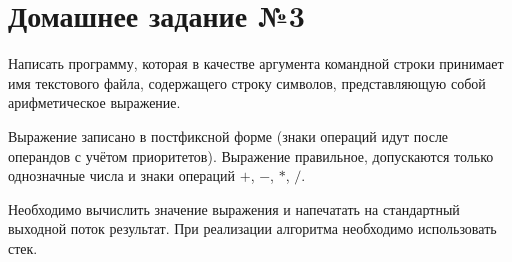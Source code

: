 \section*{Домашнее задание №3}


Написать программу, которая в качестве аргумента командной строки
принимает имя текстового файла, содержащего строку символов,
представляющую собой арифметическое выражение.

Выражение записано
в постфиксной форме (знаки операций идут после операндов с учётом
приоритетов). Выражение правильное, допускаются только однозначные
числа и знаки операций $+$, $-$, $*$, $/$.

Необходимо вычислить значение
выражения и напечатать на стандартный выходной поток результат. При
реализации алгоритма необходимо использовать стек.
